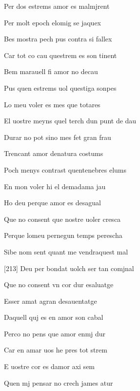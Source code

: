 \documentclass[12pt]{article}
\begin{document}
\begin{estrofa}

 Per dos estrems amor es malmjrent

 Per molt epoch elomig se jaquex

 Bes mostra pech pus contra si fallex

 Car tot co cau questrem es son tinent

 Bem marauell fi amor no decau

 Pus quen estrems uol questiga sonpes

 Lo meu voler es mes que totares

 El uostre meyns quel terch dun punt de dau

\end{estrofa}



\begin{estrofa}

 Durar no pot sino mes fet gran frau

 Trencant amor denatura costums

 Poch menys contrast quentenebres elums

 En mon voler hi el demadama jau

 Ho deu perque amor es desagual

 Que no consent que nostre uoler cresca

 Perque lomeu pernegun temps perescha

 Sibe nom sent quant me vendraquest mal

\end{estrofa}



\begin{estrofa}

 [213] Deu per bondat uolch ser tan comjnal

 Que no consent vn cor dur esaluatge

 Esser amat agran desauentatge

 Daquell quj es en amor son cabal

 Perco no pens que amor enmj dur

 Car en amar uos he pres tot strem

 E uostre cor es damor axi sem

 Quen mj pensar no crech james atur

\end{estrofa}
\end{document}
